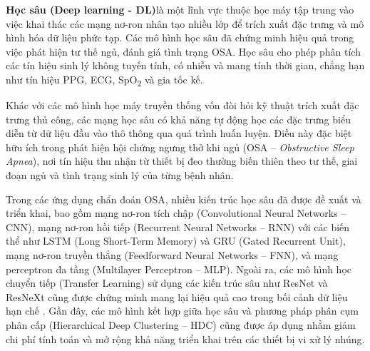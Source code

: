 \textbf{Học sâu (Deep learning - DL)}là một lĩnh vực thuộc học máy 
tập trung vào việc khai thác các mạng nơ-ron nhân tạo nhiều lớp để 
trích xuất đặc trưng và mô hình hóa dữ liệu phức tạp. Các mô hình học 
sâu đã chứng minh hiệu quả trong việc phát hiện tư thế ngủ, đánh giá tình trạng OSA. 
Học sâu cho phép phân tích các tín hiệu sinh lý không tuyến tính, 
có nhiễu và mang tính thời gian, chẳng hạn như tín hiệu PPG, ECG, 
SpO\textsubscript{2} và gia tốc kế.

Khác với các mô hình học máy truyền thống vốn đòi hỏi kỹ thuật 
trích xuất đặc trưng thủ công, các mạng học sâu có khả năng tự động 
học các đặc trưng biểu diễn từ dữ liệu đầu vào thô thông qua quá 
trình huấn luyện. Điều này đặc biệt hữu ích trong phát hiện hội 
chứng ngưng thở khi ngủ (OSA – \textit{Obstructive Sleep Apnea}), 
nơi tín hiệu thu nhận từ thiết bị đeo thường biến thiên theo tư thế, 
giai đoạn ngủ và tình trạng sinh lý của từng bệnh nhân.

Trong các ứng dụng chẩn đoán OSA, nhiều kiến trúc học sâu đã được đề xuất và triển khai, 
bao gồm mạng nơ-ron tích chập (Convolutional Neural Networks – CNN), 
mạng nơ-ron hồi tiếp (Recurrent Neural Networks – RNN) với các biến 
thể như LSTM (Long Short-Term Memory) và GRU (Gated Recurrent Unit), 
mạng nơ-ron truyền thẳng (Feedforward Neural Networks – FNN), 
và mạng perceptron đa tầng (Multilayer Perceptron – MLP). 
Ngoài ra, các mô hình học chuyển tiếp (Transfer Learning) 
sử dụng các kiến trúc sâu như ResNet và ResNeXt cũng được chứng 
minh mang lại hiệu quả cao trong bối cảnh dữ liệu hạn chế 
\cite{osa_sanchez2025, wang2023ml_wearable, rossi2023sleep, olsen2024transfer}. 
Gần đây, các mô hình kết hợp giữa học sâu và phương pháp phân 
cụm phân cấp (Hierarchical Deep Clustering – HDC) cũng được 
áp dụng nhằm giảm chi phí tính toán và mở rộng khả năng triển 
khai trên các thiết bị vi xử lý nhúng.

